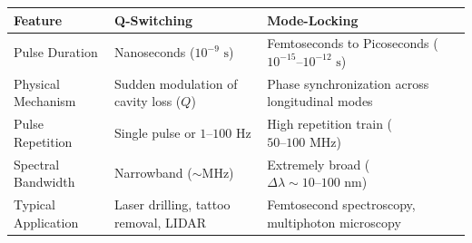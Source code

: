 \begin{theorysol}
\begin{center}
\begin{tabularx}{\linewidth}{|l|X|X|}
\textbf{Feature} & \textbf{Q-Switching} & \textbf{Mode-Locking} \\
\hline
Pulse Duration & Nanoseconds ($10^{-9}\text{ s}$) & Femtoseconds to Picoseconds ($10^{-15}\text{--}10^{-12}\text{ s}$) \\
Physical Mechanism & Sudden modulation of cavity loss ($Q$) & Phase synchronization across longitudinal modes \\
Pulse Repetition & Single pulse or $1\text{--}100\text{ Hz}$ & High repetition train ($50\text{--}100\text{ MHz}$) \\
Spectral Bandwidth & Narrowband ($\sim\text{MHz}$) & Extremely broad ($\Delta\lambda \sim 10\text{--}100\text{ nm}$) \\
Typical Application & Laser drilling, tattoo removal, LIDAR & Femtosecond spectroscopy, multiphoton microscopy \\
\hline
\end{tabularx}
\end{center}
\end{theorysol}
\vspace{4mm}

